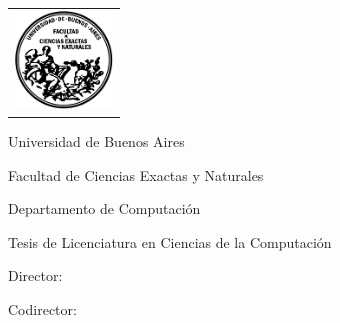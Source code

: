 \newcommand{\HRule}{\rule{\linewidth}{0.2mm}}
%
\thispagestyle{empty}

\begin{center}\leavevmode

\vspace{-2cm}

\begin{tabular}{l}
\includegraphics[width=2.6cm]{logofcen.pdf}
\end{tabular}


{\large \sc Universidad de Buenos Aires

Facultad de Ciencias Exactas y Naturales

Departamento de Computaci\'on}

\vspace{6.0cm}


{\huge\bf \tituloTesis}

\vspace{2cm}

{\large Tesis de Licenciatura en Ciencias de la Computación}

\vspace{2cm}

{\Large \autor}

\end{center}

\vfill

{\large

{Director: \director}

\vspace{.2cm}

{Codirector: \codirector}

\vspace{.2cm}

\lugar
}

\newpage\thispagestyle{empty}
